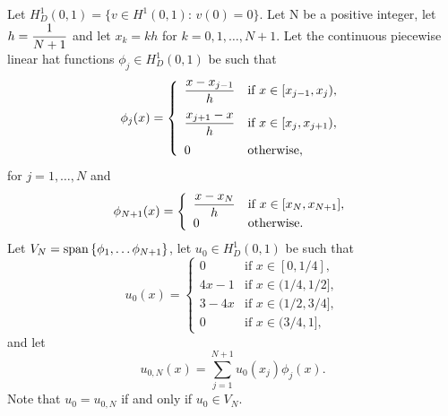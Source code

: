 Let $H^1_D\left(0,1\right)=\{v\in H^1\left(0,1\right):\,v(0)=0\}$. Let N be a positive integer, let $\displaystyle{h={1 \over N+1}}$ and let $x_k=kh$ for $k=0,1,\ldots,N+1$. Let the continuous piecewise linear hat functions $\phi_j\in H^1_D(0,1)$ be such that
\[
\phi_j(x) = \left\{\begin{array}{ll}
\displaystyle{{x-x_{j-1} \over h}} & \displaystyle{\mbox{if }x\in[x_{j-1},x_j)},
\\[10pt]
\displaystyle{{x_{j+1}-x \over h}} & \displaystyle{\mbox{if }x\in[x_j,x_{j+1})},
\\[10pt]
0 & \mbox{otherwise},
\end{array}\right.
\]
for $j=1,\ldots,N$ and
\[
\phi_{N+1}(x) = \left\{\begin{array}{ll}
\displaystyle{x-x_N \over h} & \mbox{if }x\in[x_N,x_{N+1}],\\
0& \mbox{otherwise.}
\end{array}\right.
\]
Let $V_N={\rm span}\left\{\phi_1,\ldots\phi_{N+1}\right\}$, let $u_0\in H^1_D(0,1)$ be such that
\[
u_0(x)=\left\{\begin{array}{ll}
0 & \mbox{if }x\in[0,1/4],\\
4x-1 & \mbox{if }x\in(1/4,1/2],\\
3-4x & \mbox{if }x\in(1/2,3/4],\\
0 & \mbox{if }x\in(3/4,1],
\end{array}\right.
\]
and let
\[
u_{0,N}(x)=\sum_{j=1}^{N+1}u_0(x_j)\phi_j(x).
\]
Note that $u_0=u_{0,N}$ if and only if $u_0\in V_N$.

